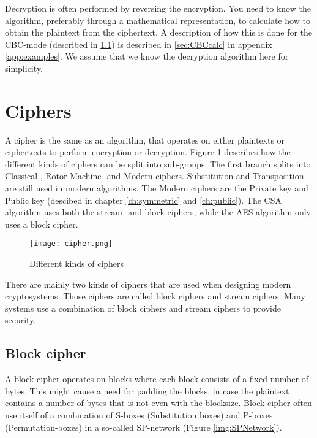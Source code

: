 Decryption is often performed by reversing the encryption. You need to 
know the algorithm, preferably through a mathematical representation, 
to calculate how to obtain the plaintext from the ciphertext. A 
description of how this is done for the CBC-mode (described in 
\ref{sec:BlockCipher}) is described in \ref{sec:CBCcalc} in appendix 
\ref{app:examples}. We assume that we know the decryption algorithm 
here for simplicity. 

\section{Ciphers}
A cipher is the same as an algorithm, that operates on either 
plaintexts or ciphertexts to perform encryption or decryption. Figure 
\ref{img:ciphers} describes how the different kinds of ciphers can be 
split into sub-groups. The first branch splits into Classical-, 
Rotor Machine- and Modern ciphers. Substitution and Transposition are 
still used in modern algorithms. The Modern ciphers are the Private 
key and Public key (descibed in chapter \ref{ch:symmetric} and 
\ref{ch:public}). The CSA algorithm uses both the stream- and block ciphers, while the AES algorithm only uses a block cipher.

\begin{figure}
  \texttt{[image: cipher.png]}
  \caption{Different kinds of ciphers \citep{CipherTax:2013}}
  \label{img:ciphers}
\end{figure}

There are mainly two kinds of ciphers that are used when designing 
modern cryptosystems. Those ciphers are called block ciphers and 
stream ciphers. Many systems use a combination of block ciphers and 
stream ciphers to provide security. 


\subsection{Block cipher}\label{sec:BlockCipher}
A block cipher operates on blocks where each block consists of a fixed 
number of bytes. This might cause a need for padding the blocks, in 
case the plaintext contains a number of bytes that is not even with the 
blocksize. Block cipher often use itself of a combination of S-boxes 
(Substitution boxes) and P-boxes (Permutation-boxes) in a so-called 
SP-network (Figure \ref{img:SPNetwork}).

